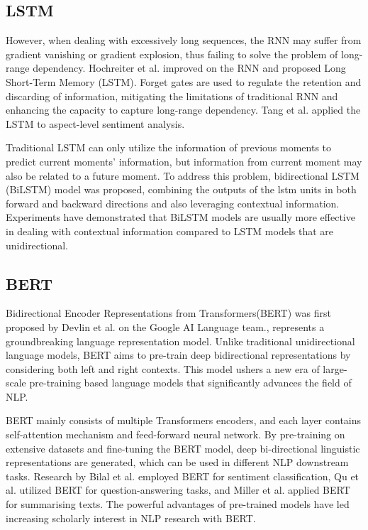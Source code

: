 \documentclass[ %
                    author={Bocheng Wang},
                supervisor={Dr. Qiang Liu},
                    degree={MSc},
                     title={A Research on Identification of Suicide Ideation in Texts with Multiple Models},
                      type={},
                      year={2024}]{dissertation}
\begin{document}
\subsection{LSTM}
\noindent
However, when dealing with excessively long sequences, the RNN may suffer from gradient vanishing or gradient explosion, thus failing to solve the problem of long-range dependency. Hochreiter et al. improved on the RNN and proposed Long Short-Term Memory (LSTM).\cite{hochreiter1997long} Forget gates are used to regulate the retention and discarding of information\cite{greff2016lstm}, mitigating the limitations of traditional RNN and enhancing the capacity to capture long-range dependency. Tang et al. applied the LSTM to aspect-level sentiment analysis.\cite{tang2015target}

Traditional LSTM can only utilize the information of previous moments to predict current moments' information, but information from current moment may also be related to a future moment. To address this problem, bidirectional LSTM (BiLSTM) model was proposed, combining the outputs of the lstm units in both forward and backward directions and also leveraging contextual information. Experiments have demonstrated that BiLSTM models are usually more effective in dealing with contextual information compared to LSTM models that are unidirectional.\cite{hameed2019computationally}

\subsection{BERT}
\noindent
Bidirectional Encoder Representations from Transformers(BERT) was first proposed by Devlin et al. on the Google AI Language team.\cite{devlin2018bert}, represents a groundbreaking language representation model. Unlike traditional unidirectional language models, BERT aims to pre-train deep bidirectional representations by considering both left and right contexts. This model ushers a new era of large-scale pre-training based language models that significantly advances the field of NLP.

BERT mainly consists of multiple Transformers encoders, and each layer contains self-attention mechanism and feed-forward neural network.\cite{vaswani2017attention} By pre-training on extensive datasets and fine-tuning the BERT model, deep bi-directional linguistic representations are generated, which can be used in different NLP downstream tasks. Research by Bilal et al. employed BERT for sentiment classification\cite{bilal2023effectiveness}, Qu et al. utilized BERT for question-answering tasks\cite{qu2019bert}, and Miller et al. applied BERT for summarising texts\cite{miller2019leveraging}. The powerful advantages of pre-trained models have led increasing scholarly interest in NLP research with BERT.
\end{document}
